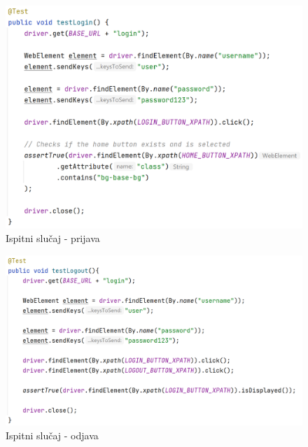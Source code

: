                 \begin{figure}[H]
        		\includegraphics[scale=1]{slike/integration_test_login.png}
        		  \centering
        		\caption{Ispitni slučaj - prijava}
        	\end{figure}
                
                \begin{figure}[H]
        		\includegraphics[scale=0.9]{slike/integration_test_logout.png} 
        		  \centering
        		\caption{Ispitni slučaj - odjava}
        	\end{figure}

